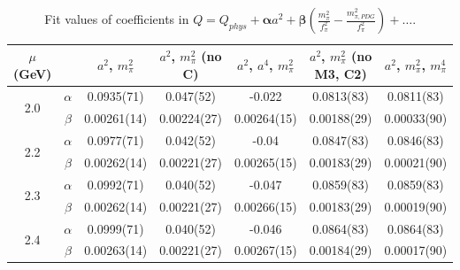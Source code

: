\documentclass[12pt]{extarticle}
\begin{document}
\begin{table}[h!]
\begin{center}
\begin{tabular}{|c c|c|c|c|c|c|}
\hline
$\mu$ (GeV) &  & $a^2$, $m_\pi^2$& $a^2$, $m_\pi^2$ (no C)& $a^2$, $a^4$, $m_\pi^2$& $a^2$, $m_\pi^2$ (no M3, C2)& $a^2$, $m_\pi^2$, $m_\pi^4$\\
\hline
\multirow{2}{0.5in}{2.0} & $\alpha$ & 0.0935(71)& 0.047(52)& -0.022& 0.0813(83)& 0.0811(83)\\
 & $\beta$ & 0.00261(14)& 0.00224(27)& 0.00264(15)& 0.00188(29)& 0.00033(90)\\
\hline
\multirow{2}{0.5in}{2.2} & $\alpha$ & 0.0977(71)& 0.042(52)& -0.04& 0.0847(83)& 0.0846(83)\\
 & $\beta$ & 0.00262(14)& 0.00221(27)& 0.00265(15)& 0.00183(29)& 0.00021(90)\\
\hline
\multirow{2}{0.5in}{2.3} & $\alpha$ & 0.0992(71)& 0.040(52)& -0.047& 0.0859(83)& 0.0859(83)\\
 & $\beta$ & 0.00262(14)& 0.00221(27)& 0.00266(15)& 0.00183(29)& 0.00019(90)\\
\hline
\multirow{2}{0.5in}{2.4} & $\alpha$ & 0.0999(71)& 0.040(52)& -0.046& 0.0864(83)& 0.0864(83)\\
 & $\beta$ & 0.00263(14)& 0.00221(27)& 0.00267(15)& 0.00184(29)& 0.00017(90)\\
\hline
\end{tabular}
\caption{Fit values of coefficients in $Q = Q_{phys} + \mathbf{\alpha} a^2 + \mathbf{\beta}\left(\frac{m_\pi^2}{f_\pi^2}-\frac{m_{\pi,PDG}^2}{f_\pi^2}\right) + \ldots$.}
\end{center}
\end{table}




















\clearpage
\end{document}
